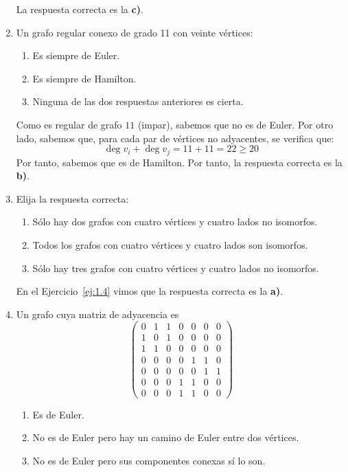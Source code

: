\begin{ejercicio}
\begin{enumerate}
        La respuesta correcta es la \textbf{c)}.
        \item Un grafo regular conexo de grado 11 con veinte vértices:
        \begin{enumerate}
            \item Es siempre de Euler.
            \item Es siempre de Hamilton.
            \item Ninguna de las dos respuestas anteriores es cierta.
        \end{enumerate}

        Como es regular de grafo $11$ (impar), sabemos que no es de Euler. Por otro lado, sabemos que, para cada par de vértices no adyacentes, se verifica que:
        \begin{equation*}
            \deg v_i + \deg v_j = 11 + 11 = 22 \geq 20
        \end{equation*}
        Por tanto, sabemos que es de Hamilton. Por tanto, la respuesta correcta es la \textbf{b)}.
        \item Elija la respuesta correcta:
        \begin{enumerate}
            \item Sólo hay dos grafos con cuatro vértices y cuatro lados no isomorfos.
            \item Todos los grafos con cuatro vértices y cuatro lados son isomorfos.
            \item Sólo hay tres grafos con cuatro vértices y cuatro lados no isomorfos.
        \end{enumerate}

        En el Ejercicio~\ref{ej:1.4} vimos que la respuesta correcta es la \textbf{a)}.
        \item Un grafo cuya matriz de adyacencia es
        \[
            \begin{pmatrix}
                0 & 1 & 1 & 0 & 0 & 0 & 0 \\
                1 & 0 & 1 & 0 & 0 & 0 & 0 \\
                1 & 1 & 0 & 0 & 0 & 0 & 0 \\
                0 & 0 & 0 & 0 & 1 & 1 & 0 \\
                0 & 0 & 0 & 0 & 0 & 1 & 1 \\
                0 & 0 & 0 & 1 & 1 & 0 & 0 \\
                0 & 0 & 0 & 1 & 1 & 0 & 0
            \end{pmatrix}
        \]
        \begin{enumerate}
            \item Es de Euler.
            \item No es de Euler pero hay un camino de Euler entre dos vértices.
            \item No es de Euler pero sus componentes conexas sí lo son.
        \end{enumerate}


\end{enumerate}
\end{ejercicio}
